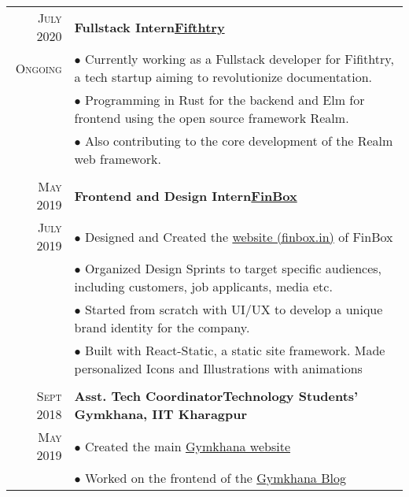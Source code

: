 \documentclass[a4paper,12pt]{extarticle} %
\let\oldtextbf\textbf
\renewcommand{\textbf}[1]{\textcolor{bold}{\oldtextbf{#1}}}
\begin{document}
\begin{tabularx}{\linewidth}{ r | X }

  \textsc{July 2020} & \textbf{Fullstack Intern}\hfill\textbf{\href{https://fifthtry.com/}{Fifthtry}}                                              \\
  \textsc{Ongoing}   & {$\bullet$ Currently working as a Fullstack developer for Fifithtry, a tech startup aiming to revolutionize documentation.} \\
                     & {$\bullet$ Programming in Rust for the backend and Elm for frontend using the open source framework Realm.}                 \\
                     & {$\bullet$ Also contributing to the core development of the Realm web framework.}                                           \\
  \multicolumn{2}{c}{}                                                                                                                             \\

  \textsc{May 2019}  & \textbf{Frontend and Design Intern}\hfill\textbf{\href{https://finbox.in/}{FinBox}}                                         \\
  \textsc{July 2019} & {$\bullet$ Designed and Created the \href{https://finbox.in/}{website (finbox.in)} of FinBox}                               \\
                     & {$\bullet$ Organized Design Sprints to target specific audiences, including customers, job applicants, media etc.
    }                                                                                                                                              \\
                     & {$\bullet$ Started from scratch with UI/UX to develop a unique brand identity for the company.
    }                                                                                                                                              \\

                     & {$\bullet$ Built with React-Static, a static site framework. Made personalized Icons and Illustrations with animations}     \\
  \multicolumn{2}{c}{}                                                                                                                             \\

  \textsc{Sept 2018} & \textbf{Asst. Tech Coordinator}\hfill\textbf{Technology Students' Gymkhana, IIT Kharagpur}                                  \\
  \textsc{May 2019}  & {$\bullet$ Created the main \href{http://www.gymkhana.iitkgp.ac.in/index.php}{Gymkhana website} }                           \\
                     & {$\bullet$ Worked on the frontend of the  \href{http://www.gymkhana.iitkgp.ac.in/blog/}{Gymkhana Blog}}                     \\
\end{tabularx}
\end{document}
